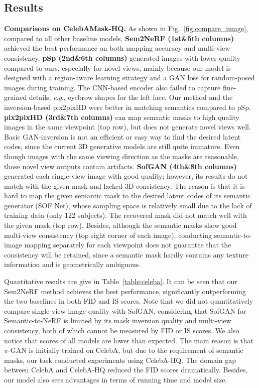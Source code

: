 \documentclass[runningheads]{llncs}
\newcommand{\eg}{\textit{e}.\textit{g}.}
\begin{document}
\subsection{Results}
\noindent\textbf{Comparisons on CelebAMask-HQ.} 
As shown in Fig.~\ref{fig:compare_image}, compared to all other baseline models,  \textbf{Sem2NeRF (1st\&5th columns)} achieved the best performance on both mapping accuracy and multi-view consistency. 
\textbf{pSp (2nd\&6th columns)} generated images with lower quality compared to ours, especially for novel views, mainly because our model is designed with a region-aware learning strategy and a GAN loss for random-posed images during training. The CNN-based encoder also failed to capture fine-grained details, \eg, eyebrow shapes for the left face. Our method and the inversion-based pix2pixHD were better in matching semantics compared to pSp.
\textbf{pix2pixHD (3rd\&7th columns)} can map semantic masks to high quality images in the same viewpoint (top row), but does not generate novel views well.
Basic GAN-inversion is not an efficient or easy way to find the desired latent codes, since the current 3D generative models are still quite immature. Even though images with the same viewing direction as the masks are reasonable, those novel view outputs contain artifacts.
\textbf{SofGAN (4th\&8th columns)} generated each single-view image with good quality; however, its results do not match with the given mask and lacked 3D consistency. The reason is that it is hard to map the given semantic mask to the desired latent codes of its semantic generator (SOF Net), whose sampling space is relatively small due to the lack of training data (only 122 subjects). The recovered mask did not match well with the given mask (top row). Besides, although the semantic masks show good multi-view consistency (top right corner of each image), conducting semantic-to-image mapping separately for each viewpoint does not guarantee that the consistency will be retained, since a semantic mask hardly contains any texture information and is geometrically ambiguous.



Quantitative results are give in Table~\ref{table:celeba}. 
It can be seen that our Sem2NeRF method achieves the best performance,  significantly outperforming the two baselines in both FID and IS scores. Note that we did not quantitatively compare single view image quality with SofGAN, considering that SofGAN for Semantic-to-NeRF is limited by its mask inversion quality and multi-view consistency, both of which cannot be measured by FID or IS scores.  We also notice that scores of all models are lower than expected. The main reason is that $\pi$-GAN is initially trained on CelebA, but due to the requirement of semantic masks, our task conducted experiments using CelebA-HQ. The domain gap between CelebA and CelebA-HQ reduced the FID scores dramatically. Besides, our model also sees advantages in terms of running time and model size. 
\end{document}
